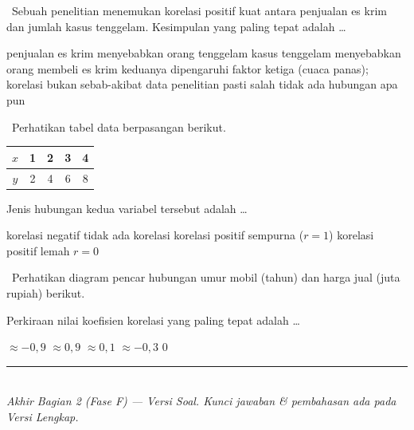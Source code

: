 \documentclass[11pt,a4paper]{exam}
\newcommand{\Adv}{{\footnotesize\textsf{\textcolor{oranye}{[Advanced]}}}\ }
\newcommand{\Exp}{{\footnotesize\textsf{\textcolor{ungu}{[Expert]}}}\ }
\begin{document}
\begin{questions}
\question \Adv Sebuah penelitian menemukan korelasi positif kuat antara penjualan
es krim dan jumlah kasus tenggelam. Kesimpulan yang paling tepat adalah \dots
\begin{choices}
\choice penjualan es krim menyebabkan orang tenggelam
\choice kasus tenggelam menyebabkan orang membeli es krim
\CorrectChoice keduanya dipengaruhi faktor ketiga (cuaca panas); korelasi bukan sebab-akibat
\choice data penelitian pasti salah
\choice tidak ada hubungan apa pun
\end{choices}

\question \Adv Perhatikan tabel data berpasangan berikut.

\begin{center}\small
\begin{tabular}{|c|c|c|c|c|}
\hline
$x$ & 1 & 2 & 3 & 4\\\hline
$y$ & 2 & 4 & 6 & 8\\\hline
\end{tabular}
\end{center}

Jenis hubungan kedua variabel tersebut adalah \dots
\begin{choices}
\choice korelasi negatif
\choice tidak ada korelasi
\CorrectChoice korelasi positif sempurna ($r=1$)
\choice korelasi positif lemah
\choice $r=0$
\end{choices}

\question \Exp Perhatikan diagram pencar hubungan umur mobil (tahun) dan harga jual
(juta rupiah) berikut.

\begin{center}
\end{center}

Perkiraan nilai koefisien korelasi yang paling tepat adalah \dots
\begin{choices}
\CorrectChoice $\approx -0{,}9$ \choice $\approx 0{,}9$ \choice $\approx 0{,}1$
\choice $\approx -0{,}3$ \choice $0$
\end{choices}

\end{questions}

\vspace{6pt}
\begin{center}
{\color{biru}\rule{\linewidth}{1pt}}\\[3pt]
{\small\textit{Akhir Bagian 2 (Fase F) — Versi Soal. Kunci jawaban \& pembahasan ada pada Versi Lengkap.}}
\end{center}
\end{document}
